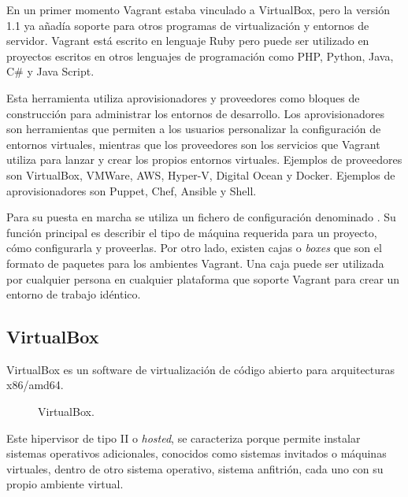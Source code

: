 En un primer momento Vagrant estaba vinculado a VirtualBox, pero la versión 1.1 ya añadía soporte para otros programas de virtualización y entornos de servidor. Vagrant está escrito en lenguaje Ruby pero puede ser utilizado en proyectos escritos en otros lenguajes de programación como PHP, Python, Java, C\# y Java Script.

Esta herramienta utiliza aprovisionadores y proveedores como bloques de construcción para administrar los entornos de desarrollo. Los aprovisionadores son herramientas que permiten a los usuarios personalizar la configuración de entornos virtuales, mientras que los proveedores son los servicios que Vagrant utiliza para lanzar y crear los propios entornos virtuales. Ejemplos de proveedores son VirtualBox, VMWare, AWS, Hyper-V, Digital Ocean y Docker. Ejemplos de aprovisionadores son Puppet, Chef, Ansible y Shell.

Para su puesta en marcha se utiliza un fichero de configuración denominado . Su función principal es describir el tipo de máquina requerida para un proyecto, cómo configurarla y proveerlas. Por otro lado, existen cajas o \textit{boxes} que son el formato de paquetes para los ambientes Vagrant. Una caja puede ser utilizada por cualquier persona en cualquier plataforma que soporte Vagrant para crear un entorno de trabajo idéntico.

\subsection{VirtualBox}

VirtualBox es un software de virtualización de código abierto para arquitecturas x86/amd64. 

\begin{figure}[H]
\caption{VirtualBox.\label{fig:figure_placement_example}}
\end{figure}

Este hipervisor de tipo II o \textit{hosted}, se caracteriza porque permite instalar sistemas operativos adicionales, conocidos como sistemas invitados o máquinas virtuales, dentro de otro sistema operativo, sistema anfitrión, cada uno con su propio ambiente virtual.

